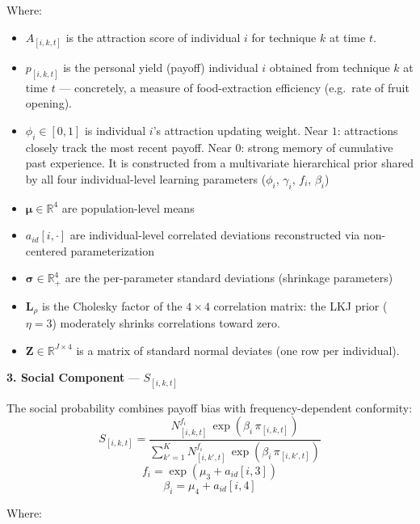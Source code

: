 \documentclass[
  letterpaper,
  DIV=11,
  numbers=noendperiod]{scrartcl}
\providecommand{\tightlist}{%
  \setlength{\itemsep}{0pt}\setlength{\parskip}{0pt}}\usepackage{longtable,booktabs,array}
\begin{document}
Where:

\begin{itemize}
\tightlist
\item
  \(A_{[i,k,t]}\) is the attraction score of individual \(i\) for
  technique \(k\) at time \(t\).
\item
  \(p_{[i,k,t]}\) is the personal yield (payoff) individual \(i\)
  obtained from technique \(k\) at time \(t\) --- concretely, a measure
  of food-extraction efficiency (e.g.~rate of fruit opening).
\item
  \(\phi_i \in [0, 1]\) is individual \(i\)'s attraction updating
  weight. Near \(1\): attractions closely track the most recent payoff.
  Near \(0\): strong memory of cumulative past experience. It is
  constructed from a multivariate hierarchical prior shared by all four
  individual-level learning parameters (\(\phi_i\), \(\gamma_i\),
  \(f_i\), \(\beta_{i}\))
\item
  \(\boldsymbol{\mu} \in \mathbb{R}^4\) are population-level means
\item
  \(a_{id}[i, \cdot]\) are individual-level correlated deviations
  reconstructed via non-centered parameterization
\item
  \(\boldsymbol{\sigma} \in \mathbb{R}^4_+\) are the per-parameter
  standard deviations (shrinkage parameters)
\item
  \(\mathbf{L}_\rho\) is the Cholesky factor of the \(4\times4\)
  correlation matrix: the LKJ prior (\(\eta=3\)) moderately shrinks
  correlations toward zero.
\item
  \(\mathbf{Z} \in \mathbb{R}^{J \times 4}\) is a matrix of standard
  normal deviates (one row per individual).
\end{itemize}

\textbf{3. Social Component} --- \(S_{[i,k,t]}\)

The social probability combines payoff bias with frequency-dependent
conformity: \[
S_{[i,k,t]} = \frac{N_{[i,k,t]}^{f_i}\, \exp(\beta_{i}\, \pi_{[i,k,t]})}{\sum_{k'=1}^{K} N_{[i,k',t]}^{f_i}\, \exp(\beta_{i}\, \pi_{[i,k',t]})}
\] \[
f_i = \exp(\mu_3 + a_{id}[i,3])
\] \[
\beta_{i} = \mu_4 + a_{id}[i,4]
\]

Where:
\end{document}
